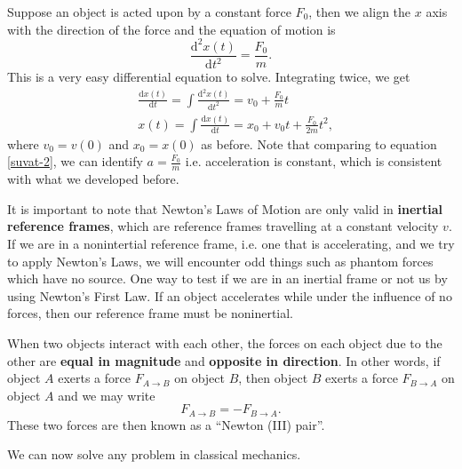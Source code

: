 \documentclass[../newtonian_mechanics.tex]{subfiles}
\begin{document}
        \begin{example}
            Suppose an object is acted upon by a constant force $F_0$, then we align the $x$ axis with the direction of the force and the equation of motion is
            \begin{equation*}
                \frac{\mathrm{d}^2x(t)}{\mathrm{d}t^2}=\frac{F_0}{m}.
            \end{equation*}
            This is a very easy differential equation to solve. Integrating twice, we get
            \begin{align*}
                &\frac{\mathrm{d}x(t)}{\mathrm{d}t}=\int\frac{\mathrm{d}^2x(t)}{\mathrm{d}t^2}=v_0+\frac{F_0}{m}t\\
                &x(t)=\int\frac{\mathrm{d}x(t)}{\mathrm{d}t}=x_0+v_0t+\frac{F_0}{2m}t^2,
            \end{align*}
            where $v_0=v(0)$ and $x_0=x(0)$ as before. Note that comparing to equation \ref{suvat-2}, we can identify $a=\frac{F_0}{m}$ i.e. acceleration is constant, which is consistent with what we developed before.
        \end{example}
        It is important to note that Newton's Laws of Motion are only valid in \textbf{inertial reference frames}, which are reference frames travelling at a constant velocity $v$. If we are in a nonintertial reference frame, i.e. one that is accelerating, and we try to apply Newton's Laws, we will encounter odd things such as phantom forces which have no source. One way to test if we are in an inertial frame or not us by using Newton's First Law. If an object accelerates while under the influence of no forces, then our reference frame must be noninertial.
        \begin{definition}
            When two objects interact with each other, the forces on each object due to the other are \textbf{equal in magnitude} and \textbf{opposite in direction}. In other words, if object $A$ exerts a force $F_{A\to B}$ on object $B$, then object $B$ exerts a force $F_{B\to A}$ on object $A$ and we may write
            \begin{equation}
                F_{A\to B}=-F_{B\to A}.
            \end{equation}
            These two forces are then known as a ``Newton (III) pair''.
        \end{definition}
        We can now solve any problem in classical mechanics.
\end{document}
